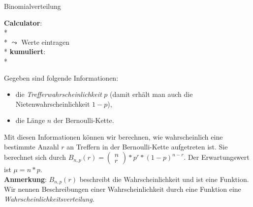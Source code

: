 \begin{bla}{Binomialverteilung}
  \begin{marginfigure}
    \begin{tcolorbox}[colback=white!95!black,colframe=white!75!black,title=CAS:,arc=0mm]
      \begin{scriptsize}
        \textbf{Calculator}: \\*
         \\*
        \( \leadsto \) Werte eintragen \\*
        \textbf{kumuliert}: \\*
      \end{scriptsize}
    \end{tcolorbox}
  \end{marginfigure}
  Gegeben sind folgende Informationen:
  \begin{itemize}
    \item die \emph{Trefferwahrscheinlichkeit} $p$ (damit erhält man auch die Nietenwahrscheinlichkeit $1-p$),
    \item die Länge $n$ der Bernoulli-Kette.
  \end{itemize}
  Mit diesen Informationen können wir berechnen, wie wahrscheinlich eine bestimmte Anzahl $r$ an Treffern in der Bernoulli-Kette aufgetreten ist. Sie berechnet sich durch $B_{n,p}(r)=\left( \begin{smallmatrix} n \\ r \end{smallmatrix} \right)*p^r*(1-p)^{n-r}$. Der Erwartungswert ist $\mu=n*p$.
  \\
  \textbf{Anmerkung}: $B_{n,p}(r)$ beschreibt die Wahrscheinlichkeit und ist eine Funktion. Wir nennen Beschreibungen einer Wahrscheinlichkeit durch eine Funktion eine \emph{Wahrscheinlichkeitsverteilung}.
\end{bla}

